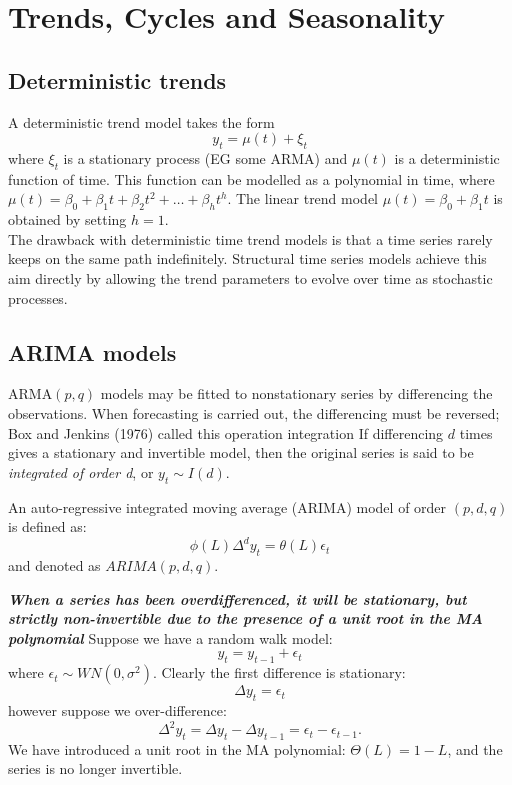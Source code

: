 \documentclass[DIV=14,titlepage=false]{scrreprt}
\begin{document}
\setcounter{chapter}{3}
\vspace{-10pt}


\chapter{Trends, Cycles and Seasonality}

\section{Deterministic trends}
A deterministic trend model takes the form
\[
    y_t = \mu (t) + \xi_t
\]
where $\xi_t$ is a stationary process (EG some ARMA) and $\mu(t)$ is a deterministic function of time. This function can be modelled as a polynomial in time, where $\mu(t) = \beta_0 + \beta_1 t + \beta_2 t^2 + \ldots + \beta_h t^h$. The linear trend model $\mu(t) = \beta_0 + \beta_1 t$ is obtained by setting $h=1$.\\
The drawback with deterministic time trend models is that a time series rarely keeps on the same path indefinitely. Structural time series models achieve this aim directly by allowing the trend parameters to evolve over time as stochastic processes.

\section{ARIMA models}
ARMA$(p,q)$ models may be fitted to nonstationary series by differencing the observations. When forecasting is carried out, the differencing must be reversed; Box and Jenkins (1976) called this operation integration If differencing $d$ times gives a stationary and invertible model, then the original series is said to be \textit{integrated of order d}, or $ y_t \sim I(d)$.
\begin{definition}
    An auto-regressive integrated moving average (ARIMA) model of order $(p,d,q)$ is defined as:
    \begin{equation}
        \label{eq:arima}
        \phi (L) \Delta^d y_t = \theta (L) \epsilon_t
    \end{equation}
    and denoted as $ARIMA(p,d,q)$.
\end{definition}
\begin{explanation}
\textit{\textbf{When a series has been overdifferenced, it will be stationary, but strictly non-invertible due to the presence of a unit root in the MA polynomial}}
Suppose we have a random walk model: 
\[y_t = y_{t-1} + \epsilon_t\]
 where $\epsilon_t \sim WN(0,\sigma^2)$. Clearly the first difference is stationary: \[\Delta y_t = \epsilon_t\]
however suppose we over-difference:
\[ \Delta^2 y_t = \Delta y_t - \Delta y_{t-1} = \epsilon_t - \epsilon_{t-1}. \]
We have introduced a unit root in the MA polynomial: $\Theta (L) = 1-L$, and the series is no longer invertible.
\end{explanation}
\end{document}

